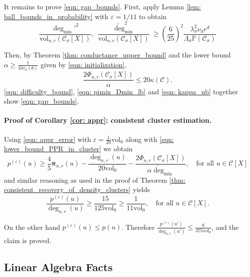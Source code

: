 \documentclass[11pt,twoside]{article}
\newcommand{\vol}{\mathrm{vol}}
\newcommand{\1}{\mathbf{1}}
\newcommand{\pbf}{p}        %
\newcommand{\pibf}{\bm{\pi}}
\newcommand{\Xbf}{X}             %
\newcommand{\Pbb}{\mathbb{P}}
\newcommand{\Cset}{\mathcal{C}}
\newcommand{\Csig}{\Cset_{\sigma}}
\newcommand{\degminpr}{\deg_{\min}'}
\newcommand{\degminwt}{\widetilde{\deg}_{\min}}
\begin{document}
It remains to prove \eqref{eqn: gap_bounds}. First, apply Lemma \ref{lem: ball_bounds_in_probability} with $\varepsilon = 1/11$ to obtain
\begin{equation}
\label{eqn: pimin_Dmin_lb}
\frac{\degminpr^2}{\vol_{n,r}(\Csig[\Xbf])},~ \frac{\degminwt^2}{\vol_{n,r}(\Csig[\Xbf])} \geq \left(\frac{6}{25}\right)^2 \frac{\lambda_{\sigma}^2 \nu_d r^d}{\Lambda_{\sigma}\Pbb(\Csig)}  
\end{equation}

Then, by Theorem \ref{thm: conductance_upper_bound} and the lower bound $\alpha \geq \frac{1}{10 \tau_{u}(\theta)}$ given by \eqref{eqn: initialization},
\begin{equation}
\label{eqn: difficulty_bound}
\frac{2\Phi_{n,r}(\Csig[\Xbf])}{\alpha} \leq 20\kappa(\Cset).
\end{equation}
\eqref{eqn: difficulty_bound}, \eqref{eqn: pimin_Dmin_lb} and \eqref{eqn: kappa_ub} together show \eqref{eqn: gap_bounds}.

\paragraph{Proof of Corollary \ref{cor: appr}: consistent cluster estimation.}

Using \eqref{eqn: appr_error} with $\varepsilon = \frac{1}{20}\vol_0$ along with \eqref{eqn: lower_bound_PPR_in_cluster} we obtain
\begin{equation*}
\pbf^{(\varepsilon)}(u) \geq \frac{4}{5} \overline{\pibf}_{n,r}(u) - \frac{\deg_{n,r}(u)}{20\vol_0} - \frac{2\Phi_{n,r}(\Csig[\Xbf])}{\alpha \degminwt}, \quad \textrm{for all $u \in \Cset[\Xbf]$}
\end{equation*}
and similar reasoning as used in the proof of Theorem \ref{thm: consistent_recovery_of_density_clusters} yields
\begin{equation*}
\frac{\pbf^{(\varepsilon)}(u)}{\deg_{n,r}(u)} \geq \frac{15}{125\vol_0} \geq \frac{1}{11 \vol_0}, \quad \textrm{for all $u \in \Cset[\Xbf]$}.
\end{equation*}

On the other hand $\pbf^{(\varepsilon)}(u) \leq \pbf(u)$. Therefore $\frac{\pbf^{(\varepsilon)}(u')}{\deg_{n,r}(u')} \leq \frac{8}{375\vol_0}$, and the claim is proved.


\subsection{Linear Algebra Facts}
\label{sec: linalg}
\end{document}
